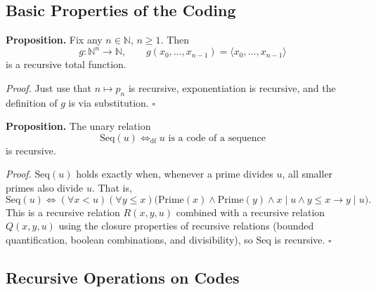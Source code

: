\documentclass[11pt]{article}
\begin{document}
\subsection{Basic Properties of the Coding}

\textbf{Proposition.} Fix any $n \in \mathbb{N}$, $n \ge 1$. Then
\[
    g\colon \mathbb{N}^n \to \mathbb{N}, \qquad g(x_0, \dots, x_{n-1}) = \langle x_0, \dots, x_{n-1}\rangle
\]
is a recursive total function.

\textit{Proof.} Just use that $n \mapsto p_n$ is recursive, exponentiation is recursive, and the definition of $g$ is via substitution. \hfill$\square$

\textbf{Proposition.} The unary relation
\[
    \mathrm{Seq}(u) \iff_{ \mathrm{df}} u \text{ is a code of a sequence}
\]
is recursive.

\textit{Proof.} $\mathrm{Seq}(u)$ holds exactly when, whenever a prime divides $u$, all smaller primes also divide $u$. That is,
\[
    \mathrm{Seq}(u) \iff (\forall x < u)(\forall y \le x)\bigl(\mathrm{Prime}(x) \land \mathrm{Prime}(y) \land x \mid u \land y \le x \rightarrow y \mid u\bigr).
\]
This is a recursive relation $R(x,y,u)$ combined with a recursive relation $Q(x,y,u)$ using the closure properties of recursive relations (bounded quantification, boolean combinations, and divisibility), so $\mathrm{Seq}$ is recursive. \hfill$\square$

\subsection{Recursive Operations on Codes}
\end{document}
